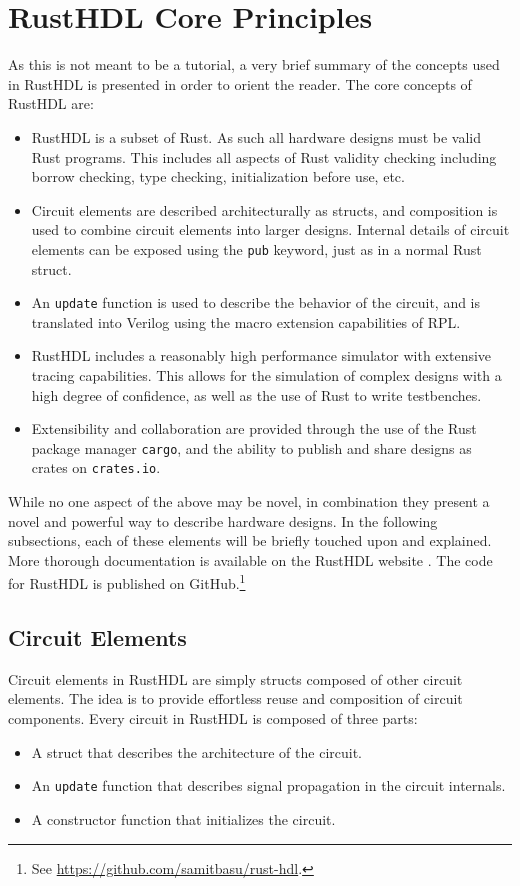 \documentclass[conference]{IEEEtran}
\begin{document}
\section{RustHDL Core Principles}\label{sec:core}

As this is not meant to be a tutorial, a very brief summary of the concepts used in RustHDL is presented
in order to orient the reader.  The core concepts of RustHDL are:

\begin{itemize}
  \item RustHDL is a subset of Rust.  As such all hardware designs must be valid Rust programs.  This includes
  all aspects of Rust validity checking including borrow checking, type checking, initialization before 
  use, etc.
  \item Circuit elements are described architecturally as structs, and composition is used to combine 
  circuit elements into larger designs. Internal details of circuit elements can be exposed using the 
  \verb|pub| keyword, just as in a normal Rust struct.
  \item An \verb|update| function is used to describe the behavior of the circuit, and is 
  translated into Verilog using the macro extension capabilities of RPL.
  \item RustHDL includes a reasonably high performance simulator with extensive tracing capabilities.
  This allows for the simulation of complex designs with a high degree of confidence, as well as 
  the use of Rust to write testbenches.
  \item Extensibility and collaboration are provided through the use of the Rust package manager \verb|cargo|, and 
  the ability to publish and share designs as crates on \verb|crates.io|.
\end{itemize}

While no one aspect of the above may be novel, in combination they present a 
novel and powerful way to describe hardware designs.  In the following subsections, each of these 
elements will be briefly touched upon and explained.  More thorough documentation is available on the
RustHDL website \cite{b6}.  The code for RustHDL is published on 
GitHub.\footnote{ See \url{https://github.com/samitbasu/rust-hdl}.}

\subsection{Circuit Elements}

Circuit elements in RustHDL are simply structs composed of other circuit elements.  The idea is to
provide effortless reuse and composition of circuit components.  Every circuit in RustHDL is composed
of three parts:
\begin{itemize}
  \item A struct that describes the architecture of the circuit.
  \item An \verb|update| function that describes signal propagation in the circuit internals.
  \item A constructor function that initializes the circuit.
\end{itemize}
\end{document}
